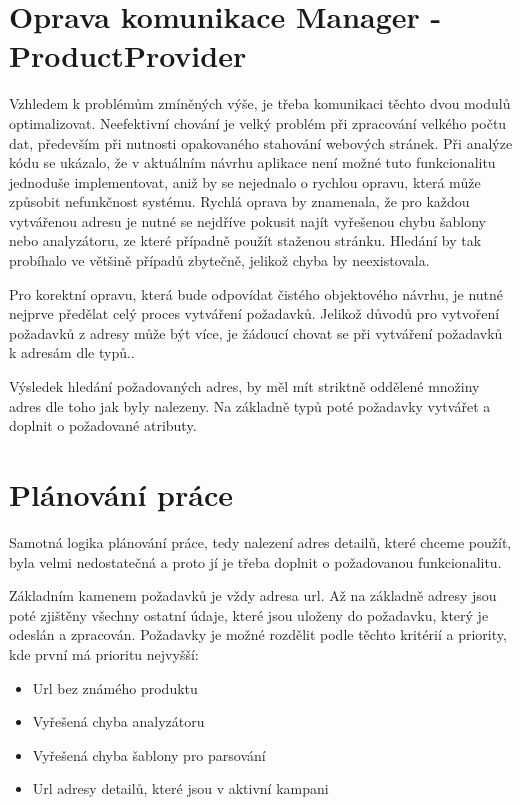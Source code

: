 \documentclass[thesis=B,czech]{FITthesis}[2012/06/26]
\begin{document}
\section{Oprava komunikace Manager - ProductProvider}
Vzhledem k problémům zmíněných výše, je třeba komunikaci těchto dvou modulů optimalizovat. Neefektivní chování je
velký problém při zpracování velkého počtu dat, především při nutnosti opakovaného stahování webových stránek. Při analýze kódu se ukázalo, že v aktuálním návrhu aplikace není možné tuto funkcionalitu jednoduše implementovat, aniž by se nejednalo o rychlou opravu, která může způsobit nefunkčnost systému. Rychlá oprava by znamenala, že pro každou vytvářenou adresu je nutné se nejdříve pokusit najít vyřešenou chybu šablony 
nebo analyzátoru, ze které případně použít staženou stránku. Hledání by tak probíhalo ve většině případů zbytečně, jelikož chyba by neexistovala.
\par
Pro korektní opravu, která bude odpovídat čistého objektového návrhu, je nutné nejprve předělat celý proces vytváření požadavků.
Jelikož důvodů pro vytvoření požadavků z adresy může být více, je žádoucí chovat se při vytváření požadavků k adresám dle typů..
\par
Výsledek hledání požadovaných adres, by měl mít striktně oddělené množiny adres dle toho jak byly nalezeny. Na základně typů poté
požadavky vytvářet a doplnit o požadované atributy.

\section{Plánování práce}
Samotná logika plánování práce, tedy nalezení adres detailů, které chceme použít, byla velmi nedostatečná a proto jí je
třeba doplnit o požadovanou funkcionalitu.
\par
Základním kamenem požadavků je vždy adresa url. Až na základně adresy jsou poté zjištěny všechny ostatní údaje, které jsou uloženy do požadavku, který je odeslán a zpracován. Požadavky je možné rozdělit podle těchto kritérií a priority, kde první má prioritu nejvyšší:

\begin{itemize}
\item Url bez známého produktu
\item Vyřešená chyba analyzátoru
\item Vyřešená chyba šablony pro parsování
\item Url adresy detailů, které jsou v aktivní kampani
\end{itemize}
\end{document}
